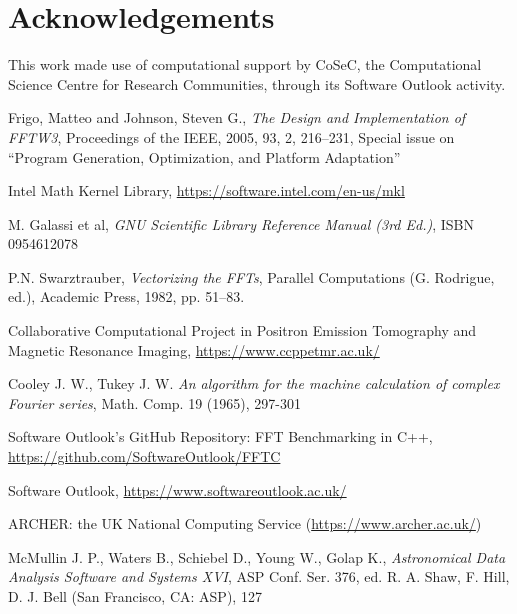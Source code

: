 \documentclass[12pt, a4paper]{article} \setlength{\textheight}{24cm}
\begin{document}
\section*{Acknowledgements}
This work made use of computational support by CoSeC, the
Computational Science Centre for Research Communities, through its
Software Outlook activity.



\begin{thebibliography}{9}
 
 Frigo, Matteo and Johnson, Steven G., {\it The Design
    and Implementation of FFTW3}, Proceedings of the IEEE, 2005, 93,
  2, 216--231, Special issue on ``Program Generation, Optimization,
  and Platform Adaptation''
  
 Intel Math Kernel Library, \url{https://software.intel.com/en-us/mkl}

 M. Galassi et al, {\it GNU Scientific Library Reference
    Manual (3rd Ed.)}, ISBN 0954612078
  
 P.N. Swarztrauber, {\it Vectorizing the FFTs},
  Parallel Computations (G. Rodrigue, ed.), Academic Press, 1982, pp.
  51--83.

  
    
 Collaborative Computational Project in Positron
  Emission Tomography and Magnetic Resonance Imaging,
  \url{https://www.ccppetmr.ac.uk/}

  

 Cooley J. W., Tukey J. W.  {\it An algorithm for the
    machine calculation of complex Fourier series}, Math. Comp. 19
  (1965), 297-301

 Software Outlook's GitHub Repository: FFT Benchmarking
  in C++, \url{https://github.com/SoftwareOutlook/FFTC}


  
 Software Outlook,
  \url{https://www.softwareoutlook.ac.uk/}


 ARCHER: the UK National Computing Service
  (\url{https://www.archer.ac.uk/})
  
 McMullin J. P., Waters B., Schiebel D., Young W., Golap
  K., {\it Astronomical Data Analysis Software and Systems XVI}, ASP
  Conf. Ser. 376, ed. R. A. Shaw, F. Hill, D. J. Bell (San Francisco,
  CA: ASP), 127
  
\end{thebibliography}
\end{document}
